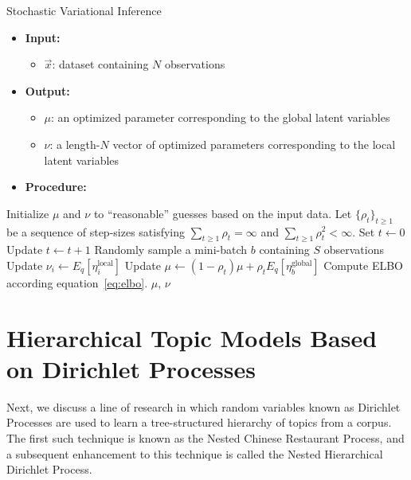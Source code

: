 \documentclass{article}
\begin{document}
\begin{algorithm}[hbt]
\caption{Stochastic Variational Inference}
\label{alg:svi}
\renewcommand{\labelitemi}{{$\bullet$}}
\renewcommand{\labelitemii}{{\tiny$\blacksquare$}}
\begin{itemize}[leftmargin=*]
\item \textbf{Input:}
  \begin{itemize}
  \item $\vec x$: dataset containing $N$ observations
  \end{itemize}
\item \textbf{Output:}
  \begin{itemize}
  \item $\mu$: an optimized parameter corresponding to the global latent variables
  \item $\nu$: a length-$N$ vector of optimized parameters corresponding to the local latent variables
  \end{itemize}
\item \textbf{Procedure:}
\end{itemize}
\begin{algorithmic}
\State Initialize $\mu$ and $\nu$ to ``reasonable'' guesses based on the input data.
\State Let $\{\rho_t\}_{t \geq 1}$ be a sequence of step-sizes satisfying $\sum_{t \geq 1} \rho_t = \infty$ and $\sum_{t \geq 1} \rho_t^2 < \infty$.
\State Set $t \gets 0$
  \State Update $t \gets t + 1$
  \State Randomly sample a mini-batch $b$ containing $S$ observations
    \State Update $\nu_i \gets E_q[\eta^{\text{local}}_i]$
  \EndFor
  \State Update $\mu \gets (1-\rho_t)\mu + \rho_t E_q[\eta^{\text{global}}_b]$
  \State Compute ELBO according equation~\eqref{eq:elbo}.
\EndWhile
\State \Return $\mu$, $\nu$
\end{algorithmic}
\end{algorithm}

\section{Hierarchical Topic Models Based on Dirichlet Processes}

Next, we discuss a line of research in which random variables known as Dirichlet Processes are used to learn a tree-structured hierarchy of topics from a corpus.
The first such technique is known as the Nested Chinese Restaurant Process, and a subsequent enhancement to this technique is called the Nested Hierarchical Dirichlet Process.
\end{document}
